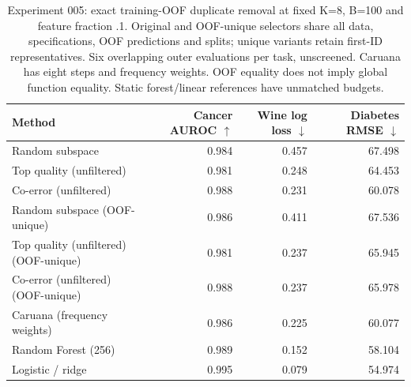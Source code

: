 \begin{table}[t]
\centering\small
\begin{tabular}{lrrr}
\toprule
Method & Cancer AUROC $\uparrow$ & Wine log loss $\downarrow$ & Diabetes RMSE $\downarrow$ \\
\midrule
Random subspace & 0.984 & 0.457 & 67.498 \\
Top quality (unfiltered) & 0.981 & 0.248 & 64.453 \\
Co-error (unfiltered) & 0.988 & 0.231 & 60.078 \\
Random subspace (OOF-unique) & 0.986 & 0.411 & 67.536 \\
Top quality (unfiltered) (OOF-unique) & 0.981 & 0.237 & 65.945 \\
Co-error (unfiltered) (OOF-unique) & 0.988 & 0.237 & 65.978 \\
Caruana (frequency weights) & 0.986 & 0.225 & 60.077 \\
Random Forest (256) & 0.989 & 0.152 & 58.104 \\
Logistic / ridge & 0.995 & 0.079 & 54.974 \\
\bottomrule
\end{tabular}
\caption{Experiment 005: exact training-OOF duplicate removal at fixed K=8, B=100 and feature fraction .1. Original and OOF-unique selectors share all data, specifications, OOF predictions and splits; unique variants retain first-ID representatives. Six overlapping outer evaluations per task, unscreened. Caruana has eight steps and frequency weights. OOF equality does not imply global function equality. Static forest/linear references have unmatched budgets.}
\end{table}
